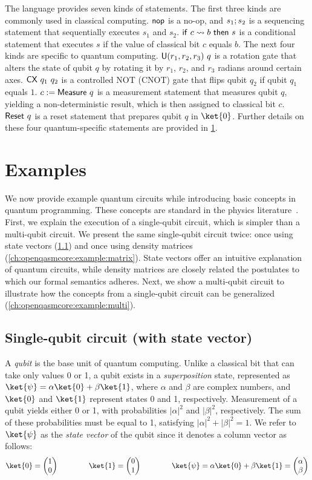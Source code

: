 The language provides seven kinds of statements.
%
The first three kinds are commonly used in classical computing.
%
$\inop$ is a no-op, and $\iseq{s_1}{s_2}$ is a sequencing statement that
sequentially executes $s_1$ and $s_2$.
%
$\iif{c}{b}{s}$ is a conditional statement that executes $s$ if the value of
classical bit $c$ equals $b$.
%
The next four kinds are specific to quantum computing.
%
$\irotate{r_1}{r_2}{r_3}{q}$ is a rotation gate that alters the state of qubit
$q$ by rotating it by $r_1$, $r_2$, and $r_3$ radians around certain axes.
%
$\icnot{q_1}{q_2}$ is a controlled NOT (CNOT) gate that flips qubit $q_2$ if
qubit $q_1$ equals $1$.
%
$\imeasure{q}{c}$ is a measurement statement that measures qubit $q$, yielding a
non-deterministic result, which is then assigned to classical bit $c$.
%
$\ireset{q}$ is a reset statement that prepares qubit $q$ in $\ket{0}$.
%
Further details on these four quantum-specific statements are provided in
\cref{ch:openqasmcore:example}.

\section{Examples}
\label{ch:openqasmcore:example}

\noindent
We now provide example quantum circuits while introducing basic concepts in
quantum programming.
%
These concepts are standard in the physics
literature~\cite{hayashi2014introduction}.
%
First, we explain the execution of a single-qubit circuit, which is simpler
than a multi-qubit circuit.
%
We present the same single-qubit circuit twice: once using state vectors
(\cref{ch:openqasmcore:example:vector}) and once using density matrices
(\cref{ch:openqasmcore:example:matrix}).
%
State vectors offer an intuitive explanation of quantum circuits, while density
matrices are closely related the postulates to which our formal semantics
adheres.
%
Next, we show a multi-qubit circuit to illustrate how the concepts from a
single-qubit circuit can be generalized (\cref{ch:openqasmcore:example:multi}).

\subsection{Single-qubit circuit (with state vector)}
\label{ch:openqasmcore:example:vector}

\noindent
A \emph{qubit} is the base unit of quantum computing.
%
Unlike a classical bit that can take only values 0 or 1, a qubit exists in a
\emph{superposition} state, represented as
$\ket{\psi}=\alpha\ket{0}+\beta\ket{1}$, where $\alpha$ and $\beta$ are complex
numbers, and $\ket{0}$ and $\ket{1}$ represent states 0 and 1, respectively.
%
Measurement of a qubit yields either 0 or 1, with probabilities $|\alpha|^2$
and $|\beta|^2$, respectively.
%
The sum of these probabilities must be equal to 1, satisfying
$|\alpha|^2+|\beta|^2=1$.
%
We refer to $\ket{\psi}$ as the \emph{state vector} of the qubit since it
denotes a column vector as follows:
%
\[
	\ket{0}=\mtrx{1\\0}
	\qquad\qquad
	\ket{1}=\mtrx{0\\1}
	\qquad\qquad
	\ket{\psi}=\alpha\ket{0}+\beta\ket{1}=\mtrx{\alpha\\\beta}
\]

